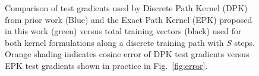 \begin{figure}[!ht]
\begin{tikzpicture}[scale=1.4]
    

\end{tikzpicture}
\caption{Comparison of test gradients used by Discrete Path Kernel (DPK) from prior work (Blue) and the Exact Path Kernel (EPK) proposed in this work (green) versus total training vectors (black) used for both kernel formulations along a discrete training path with $S$ steps. Orange shading indicates cosine error of DPK test gradients versus EPK test gradients shown in practice in Fig.~\ref{fig:error}. }
\label{fig:vecs}
\end{figure}

